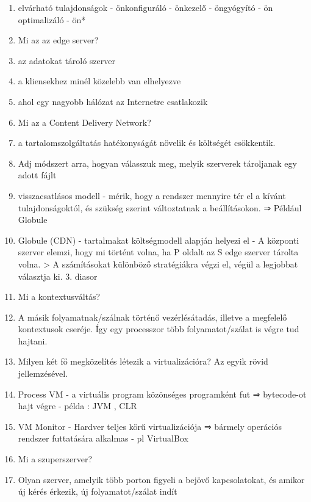 \documentclass[twoside, a4paper, 12pt]{article}
\begin{document}
\begin{enumerate}
            \item elvárható tulajdonságok
                - önkonfiguráló
                - önkezelő
                - öngyógyító
                - ön optimalizáló
                - ön*
            \item Mi az az edge server?
            \item az adatokat tároló szerver
            \item a kliensekhez minél közelebb van elhelyezve
            \item ahol egy nagyobb hálózat az Internetre csatlakozik
            \item Mi az a  Content Delivery Network?
            \item a tartalomszolgáltatás hatékonyságát növelik és költségét csökkentik.
            \item Adj módszert arra, hogyan válasszuk meg, melyik szerverek tároljanak egy adott fájlt
            \item visszacsatlásos modell
                - mérik, hogy a rendszer mennyire tér el a kívánt tulajdonságoktól, és szükség szerint változtatnak a
                beállításokon. ⇒ Például Globule
            \item Globule (CDN)
                - tartalmakat költségmodell alapján helyezi el
                - A központi szerver elemzi, hogy mi történt volna, ha P oldalt az S edge szerver tárolta volna.
                > A számításokat különböző stratégiákra végzi el, végül a legjobbat választja ki.
                3. diasor
            \item  Mi a kontextusváltás?
            \item A másik folyamatnak/szálnak történő  vezérlésátadás, illetve a megfelelő kontextusok cseréje. Így egy
                processzor több folyamatot/szálat is végre tud hajtani.
            \item  Milyen két fő megközelítés létezik a virtualizációra? Az egyik rövid jellemzésével.
            \item Process VM
                - a virtuális program közönséges programként fut ⇒ bytecode-ot hajt végre
                - példa : JVM , CLR
            \item VM Monitor
                - Hardver teljes körű virtualizációja ⇒ bármely operációs rendszer futtatására alkalmas
                - pl VirtualBox
            \item  Mi a szuperszerver?
            \item Olyan szerver, amelyik több porton figyeli a bejövő kapcsolatokat, és amikor új kérés érkezik, új folyamatot/szálat indít

\end{enumerate}
\end{document}
